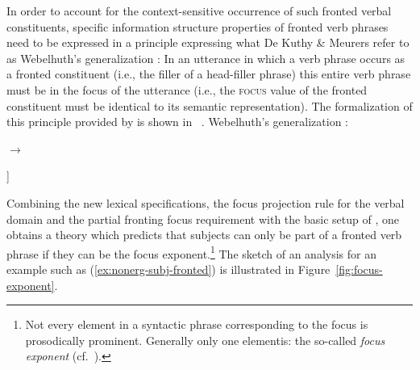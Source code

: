\documentclass[output=paper]{langsci/langscibook}
\begin{document}
In order to account for the context-sensitive occurrence of such
fronted verbal constituents, specific information structure properties
of fronted verb phrases need to be expressed in a principle expressing
what De Kuthy \& Meurers refer to as Webelhuth's generalization \citep[53]{Webelhuth90-ohne-crossref}: In
an utterance in which a verb phrase occurs as a fronted constituent
(i.e., the filler of a head-filler phrase) this entire verb phrase
must be in the focus of the utterance (i.e., the \textsc{focus} value
of the fronted constituent must be identical to its semantic
representation).  The formalization of this principle provided by \citep{dKM2003a} is shown in~ .
\ea
\bigskip
Webelhuth's generalization \citep{dKM2003a}:\\
\begin{flushleft}
\qquad\begin{avm}
\end{avm}
$\to$\ 
\end{flushleft}
\begin{flushright}
\begin{avm}
  [info-struc|focus <@1>\\
  non-head-dtr  [info-struc|focus & <@1>\\
  synsem|loc|cont|lf & @1]]\qquad
\end{avm}\medskip
\label{fig:webelhuths-generalization}
\end{flushright}\unskip
\z
Combining the new lexical specifications, the focus projection rule
for the verbal domain and the partial fronting focus requirement with
the basic setup of \cite{deKuthy2002a}, one obtains a theory which
predicts that subjects can only be part of a fronted verb phrase
if they can be the focus exponent.\footnote{Not every element in a syntactic phrase corresponding to the focus is prosodically prominent. Generally only one elementis: the so-called \textit{focus exponent} (cf.\ \citealt{Selkirk95a-u}).} The sketch of an analysis for an
example such as (\ref{ex:nonerg-subj-fronted}) is illustrated in
Figure~\ref{fig:focus-exponent}.
\end{document}
